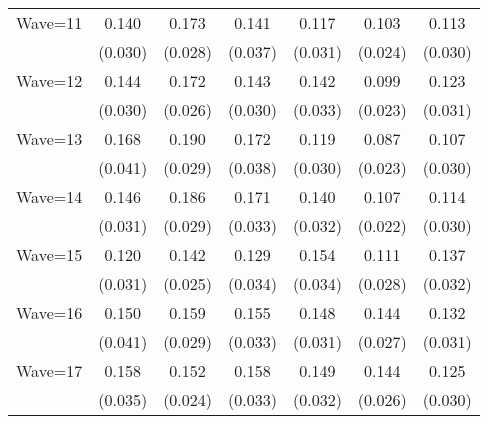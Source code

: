 {\begin{tabular}{l*{6}{c}}
Wave=11             &       0.140\sym{***}&       0.173\sym{***}&       0.141\sym{***}&       0.117\sym{***}&       0.103\sym{***}&       0.113\sym{***}\\
                    &     (0.030)         &     (0.028)         &     (0.037)         &     (0.031)         &     (0.024)         &     (0.030)         \\
Wave=12             &       0.144\sym{***}&       0.172\sym{***}&       0.143\sym{***}&       0.142\sym{***}&       0.099\sym{***}&       0.123\sym{***}\\
                    &     (0.030)         &     (0.026)         &     (0.030)         &     (0.033)         &     (0.023)         &     (0.031)         \\
Wave=13             &       0.168\sym{***}&       0.190\sym{***}&       0.172\sym{***}&       0.119\sym{***}&       0.087\sym{***}&       0.107\sym{***}\\
                    &     (0.041)         &     (0.029)         &     (0.038)         &     (0.030)         &     (0.023)         &     (0.030)         \\
Wave=14             &       0.146\sym{***}&       0.186\sym{***}&       0.171\sym{***}&       0.140\sym{***}&       0.107\sym{***}&       0.114\sym{***}\\
                    &     (0.031)         &     (0.029)         &     (0.033)         &     (0.032)         &     (0.022)         &     (0.030)         \\
Wave=15             &       0.120\sym{***}&       0.142\sym{***}&       0.129\sym{***}&       0.154\sym{***}&       0.111\sym{***}&       0.137\sym{***}\\
                    &     (0.031)         &     (0.025)         &     (0.034)         &     (0.034)         &     (0.028)         &     (0.032)         \\
Wave=16             &       0.150\sym{***}&       0.159\sym{***}&       0.155\sym{***}&       0.148\sym{***}&       0.144\sym{***}&       0.132\sym{***}\\
                    &     (0.041)         &     (0.029)         &     (0.033)         &     (0.031)         &     (0.027)         &     (0.031)         \\
Wave=17             &       0.158\sym{***}&       0.152\sym{***}&       0.158\sym{***}&       0.149\sym{***}&       0.144\sym{***}&       0.125\sym{***}\\
                    &     (0.035)         &     (0.024)         &     (0.033)         &     (0.032)         &     (0.026)         &     (0.030)         \\

\end{tabular}}

